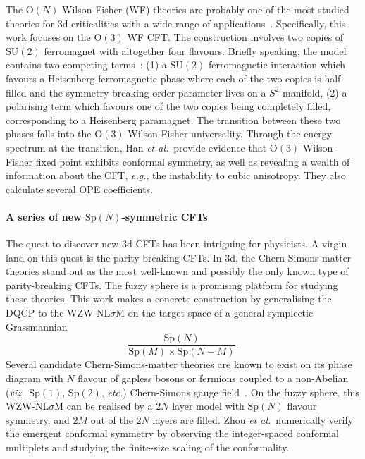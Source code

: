 \documentclass{timesjhep}
\begin{document}
The $\mathrm{O}(N)$ Wilson-Fisher (WF) theories are probably one of the most studied theories for 3d criticalities with a wide range of applications~\cite{Wilson1971WF,Sachdev2011Quantum,Cardy1996Scaling}. Specifically, this work focuses on the $\mathrm{O}(3)$ WF CFT. The construction involves two copies of $\mathrm{SU}(2)$ ferromagnet with altogether four flavours. Briefly speaking, the model contains two competing terms~: (1) a $\mathrm{SU}(2)$ ferromagnetic interaction which favours a Heisenberg ferromagnetic phase where each of the two copies is half-filled and the symmetry-breaking order parameter lives on a $S^2$ manifold, (2) a polarising term which favours one of the two copies being completely filled, corresponding to a Heisenberg paramagnet. The transition between these two phases falls into the $\mathrm{O}(3)$ Wilson-Fisher universality. Through the energy spectrum at the transition, Han \textit{et al.}~provide evidence that $\mathrm{O}(3)$ Wilson-Fisher fixed point exhibits conformal symmetry, as well as revealing a wealth of information about the CFT, \textit{e.g.}, the instability to cubic anisotropy. They also calculate several OPE coefficients.

\paragraph{A series of new $\mathrm{Sp}(N)$-symmetric CFTs~\cite{Zhou2024Oct}}

The quest to discover new 3d CFTs has been intriguing for physicists. A virgin land on this quest is the parity-breaking CFTs. In 3d, the Chern-Simons-matter theories stand out as the most well-known and possibly the only known type of parity-breaking CFTs. The fuzzy sphere is a promising platform for studying these theories. This work makes a concrete construction by generalising the DQCP to the WZW-NL$\sigma$M on the target space of a general symplectic Grassmannian
\begin{equation}
    \frac{\mathrm{Sp}(N)}{\mathrm{Sp}(M)\times\mathrm{Sp}(N-M)}.
\end{equation}
Several candidate Chern-Simons-matter theories are known to exist on its phase diagram with $N$ flavour of gapless bosons or fermions coupled to a non-Abelian (\textit{viz.}~$\mathrm{Sp}(1)$, $\mathrm{Sp}(2)$, \textit{etc.}) Chern-Simons gauge field~\cite{Komargodski2017QCD}. On the fuzzy sphere, this WZW-NL$\sigma$M can be realised by a $2N$ layer model with $\mathrm{Sp}(N)$ flavour symmetry, and $2M$ out of the $2N$ layers are filled. Zhou \textit{et al.}~numerically verify the emergent conformal symmetry by observing the integer-spaced conformal multiplets and studying the finite-size scaling of the conformality.
\end{document}
